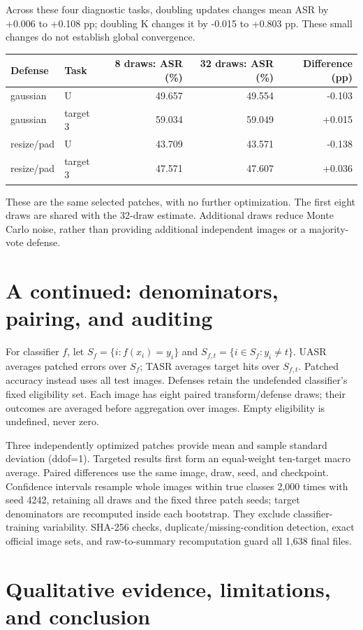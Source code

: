 \documentclass{article}
\begin{document}
Across these four diagnostic tasks, doubling updates changes mean ASR by +0.006 to +0.108 pp; doubling K changes it by -0.015 to +0.803 pp. These small changes do not establish global convergence.
\begin{center}\small
\begin{tabular}{llrrr}\toprule
Defense & Task & 8 draws: ASR (\%) & 32 draws: ASR (\%) & Difference (pp)\\\midrule
gaussian & U & 49.657 & 49.554 & -0.103\\
gaussian & target 3 & 59.034 & 59.049 & +0.015\\
resize/pad & U & 43.709 & 43.571 & -0.138\\
resize/pad & target 3 & 47.571 & 47.607 & +0.036\\
\bottomrule\end{tabular}\end{center}
These are the same selected patches, with no further optimization. The first eight draws are shared with the 32-draw estimate. Additional draws reduce Monte Carlo noise, rather than providing additional independent images or a majority-vote defense.
\section*{A continued: denominators, pairing, and auditing}
For classifier $f$, let $S_f=\{i:f(x_i)=y_i\}$ and $S_{f,t}=\{i\in S_f:y_i\ne t\}$. UASR averages patched errors over $S_f$; TASR averages target hits over $S_{f,t}$. Patched accuracy instead uses all test images. Defenses retain the undefended classifier's fixed eligibility set. Each image has eight paired transform/defense draws; their outcomes are averaged before aggregation over images. Empty eligibility is undefined, never zero.

Three independently optimized patches provide mean and sample standard deviation (ddof=1). Targeted results first form an equal-weight ten-target macro average. Paired differences use the same image, draw, seed, and checkpoint. Confidence intervals resample whole images within true classes 2,000 times with seed 4242, retaining all draws and the fixed three patch seeds; target denominators are recomputed inside each bootstrap. They exclude classifier-training variability. SHA-256 checks, duplicate/missing-condition detection, exact official image sets, and raw-to-summary recomputation guard all 1,638 final files.
\clearpage
\section{Qualitative evidence, limitations, and conclusion}
\end{document}
